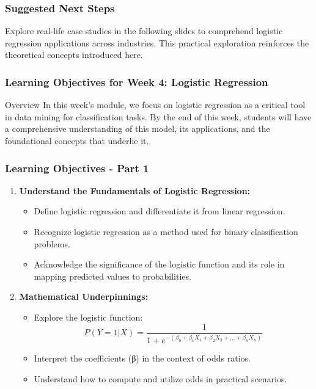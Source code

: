 \documentclass[aspectratio=169]{beamer}
\begin{document}
\begin{frame}[fragile]
    \frametitle{Suggested Next Steps}
    Explore real-life case studies in the following slides to comprehend logistic regression applications across industries. This practical exploration reinforces the theoretical concepts introduced here.
\end{frame}

\begin{frame}[fragile]
    \frametitle{Learning Objectives for Week 4: Logistic Regression}
    \begin{block}{Overview}
        In this week's module, we focus on logistic regression as a critical tool in data mining for classification tasks. By the end of this week, students will have a comprehensive understanding of this model, its applications, and the foundational concepts that underlie it.
    \end{block}
\end{frame}

\begin{frame}[fragile]
    \frametitle{Learning Objectives - Part 1}
    \begin{enumerate}
        \item \textbf{Understand the Fundamentals of Logistic Regression:}
        \begin{itemize}
            \item Define logistic regression and differentiate it from linear regression.
            \item Recognize logistic regression as a method used for binary classification problems.
            \item Acknowledge the significance of the logistic function and its role in mapping predicted values to probabilities.
        \end{itemize}

        \item \textbf{Mathematical Underpinnings:}
        \begin{itemize}
            \item Explore the logistic function:
            \begin{equation}
            P(Y=1 | X) = \frac{1}{1 + e^{-(\beta_0 + \beta_1 X_1 + \beta_2 X_2 + ... + \beta_n X_n)}}
            \end{equation}
            \item Interpret the coefficients (β) in the context of odds ratios.
            \item Understand how to compute and utilize odds in practical scenarios.
        \end{itemize}
    \end{enumerate}
\end{frame}
\end{document}
